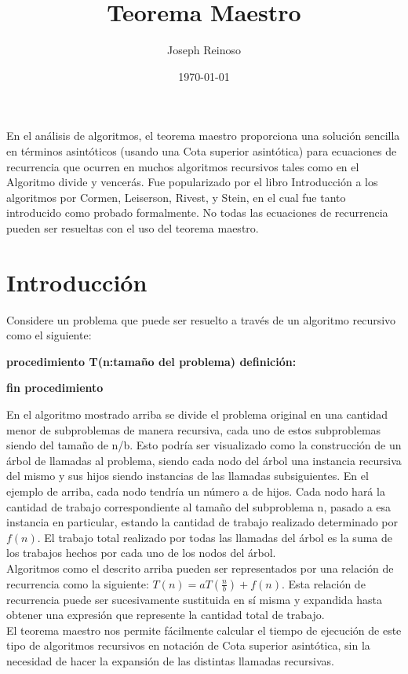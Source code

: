 \documentclass{article}
\title{Teorema Maestro}
\author{Joseph Reinoso}
\date{\today}
\begin{document}
\tableofcontents{}
\newpage
\maketitle
En el análisis de algoritmos, el teorema maestro proporciona una solución sencilla en términos asintóticos (usando una Cota superior asintótica) para ecuaciones de recurrencia que ocurren en muchos algoritmos recursivos tales como en el Algoritmo divide y vencerás. Fue popularizado por el libro Introducción a los algoritmos por Cormen, Leiserson, Rivest, y Stein, en el cual fue tanto introducido como probado formalmente. No todas las ecuaciones de recurrencia pueden ser resueltas con el uso del teorema maestro.
\section{Introducción}
Considere un problema que puede ser resuelto a través de un algoritmo recursivo como el siguiente:
\begin{algorithmic}
\item \textbf{procedimiento T(n:tamaño del problema) definición:}
\EndIf
\item \textbf{fin procedimiento}
\end{algorithmic}
En el algoritmo mostrado arriba se divide el problema original en una cantidad menor de subproblemas de manera recursiva, cada uno de estos subproblemas siendo del tamaño de n/b. Esto podría ser visualizado como la construcción de un árbol de llamadas al problema, siendo cada nodo del árbol una instancia recursiva del mismo y sus hijos siendo instancias de las llamadas subsiguientes. En el ejemplo de arriba, cada nodo tendría un número a de hijos. Cada nodo hará la cantidad de trabajo correspondiente al tamaño del subproblema n, pasado a esa instancia en particular, estando la cantidad de trabajo realizado determinado por ${\displaystyle f(n)}$. El trabajo total realizado por todas las llamadas del árbol es la suma de los trabajos hechos por cada uno de los nodos del árbol.\\
Algoritmos como el descrito arriba pueden ser representados por una relación de recurrencia como la siguiente: $T(n) = aT(\frac{n}{b})+\displaystyle{f(n)}$. Esta relación de recurrencia puede ser sucesivamente sustituida en sí misma y expandida hasta obtener una expresión que represente la cantidad total de trabajo.\cite{owenl.astrachan2003}\\
El teorema maestro nos permite fácilmente calcular el tiempo de ejecución de este tipo de algoritmos recursivos en notación de Cota superior asintótica, sin la necesidad de hacer la expansión de las distintas llamadas recursivas.
\end{document}
